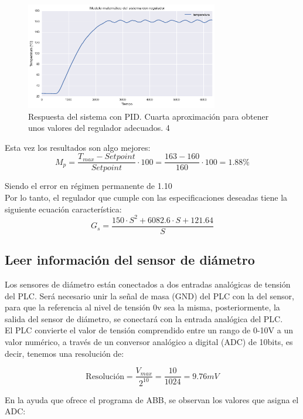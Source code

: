 \begin{figure}[H]
    \centering
    \includegraphics[width=0.75\textwidth]{images/PLC/modelado/modelado_38_1.png}
    \caption[Respuesta del sistema con PID. Iteracción 4]{Respuesta del sistema con PID. Cuarta aproximación para obtener unos valores del regulador adecuados. 4}
    \label{fig:plc_PID4}
\end{figure}

Esta vez los resultados son algo mejores:
$$M_{p}=\frac{T_{max}-Setpoint}{Setpoint} \cdot 100 = \frac{163-160}{160} \cdot 100 = 1.88\%$$ 

Siendo el error en régimen permanente de 1.10\\

Por lo tanto, el regulador que cumple con las especificaciones deseadas tiene la siguiente ecuación característica:
$$G_s = \frac{150 \cdot S^2 + 6082.6 \cdot S + 121.64}{S}$$

\subsection{Leer información del sensor de diámetro}
\label{sec:plc_diametro}

Los sensores de diámetro están conectados a dos entradas analógicas de tensión del PLC. Será necesario unir la señal de masa (GND) del PLC con la del sensor, para que la referencia al nivel de tensión 0v sea la misma, posteriormente, la salida del sensor de diámetro, se conectará con la entrada analógica del PLC.\\

El PLC convierte el valor de tensión comprendido entre un rango de 0-10V a un valor numérico, a través de un conversor analógico a digital (ADC) de 10bits, es decir, tenemos una resolución de:

$$ \text{Resolución}=\frac{ V_{max} } {2^{10} } = \frac{10}{1024} = 9.76 mV$$

En la ayuda que ofrece el programa de ABB, se observan los valores que asigna el ADC:

